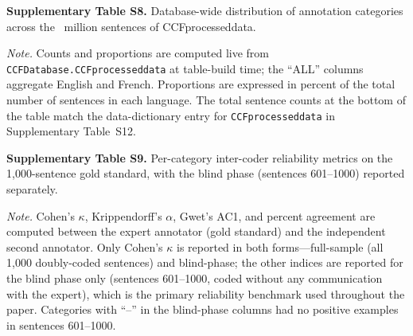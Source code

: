 \documentclass[12pt]{article}
\makeatletter
\let\CCFlandscape@orig\landscape
\renewcommand{\landscape}{%
  \CCFlandscape@orig
  \setlength{\textwidth}{\dimexpr\paperheight-5cm\relax}%
  \setlength{\linewidth}{\textwidth}%
  \setlength{\hsize}{\textwidth}%
  \setlength{\columnwidth}{\textwidth}%
}
\renewcommand\_{\texttt{\detokenize{_}\allowbreak}}
\makeatother
\begin{document}
\endlandscape

\landscape
\noindent\textbf{Supplementary Table S8.} Database-wide distribution of annotation categories across the \CCFsentApprox{}~million sentences of CCF\_processed\_data.
\vspace{0.5em}

{\footnotesize

}

\vspace{0.5em}
\noindent\footnotesize
\textit{Note.} Counts and proportions are computed live from \texttt{CCF\_Database.CCF\_processed\_data} at table-build time; the ``ALL'' columns aggregate English and French. Proportions are expressed in percent of the total number of sentences in each language. The total sentence counts at the bottom of the table match the data-dictionary entry for \texttt{CCF\_processed\_data} in Supplementary Table~S12.

\endlandscape



\landscape
\noindent\textbf{Supplementary Table S9.} Per-category inter-coder reliability metrics on the 1{,}000-sentence gold standard, with the blind phase (sentences 601--1000) reported separately.
\vspace{0.5em}

{\footnotesize

}

\vspace{0.5em}
\noindent\footnotesize
\textit{Note.} Cohen's $\kappa$, Krippendorff's $\alpha$, Gwet's AC1, and percent agreement are computed between the expert annotator (gold standard) and the independent second annotator. Only Cohen's $\kappa$ is reported in both forms---full-sample (all 1{,}000 doubly-coded sentences) and blind-phase; the other indices are reported for the blind phase only (sentences 601--1000, coded without any communication with the expert), which is the primary reliability benchmark used throughout the paper. Categories with ``--'' in the blind-phase columns had no positive examples in sentences 601--1000.
\end{document}
